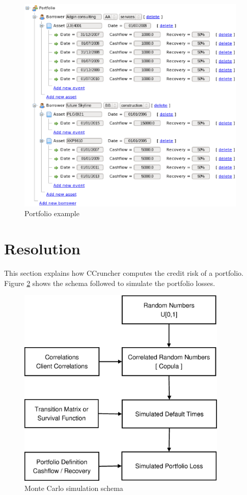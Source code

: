 \documentclass[a4paper,12pt,final]{article}
\begin{document}
\begin{figure}[!hbt]
\begin{center}
\includegraphics[height=10.5cm, angle=0]{./images/portfolio.eps}
\caption{Portfolio example}
\label{portfolio}
\end{center}
\end{figure}
\FloatBarrier

\clearpage
\section{Resolution}

This section explains how CCruncher computes the credit risk of a portfolio.
Figure \ref{fig:mcschema1} shows the schema followed to simulate the 
portfolio losses.

\begin{figure}[!hb]
\begin{center}
\includegraphics[width=10cm,angle=0]{./images/esquema1.eps}
\caption{Monte Carlo simulation schema}
\label{fig:mcschema1}
\end{center}
\end{figure}
\end{document}

